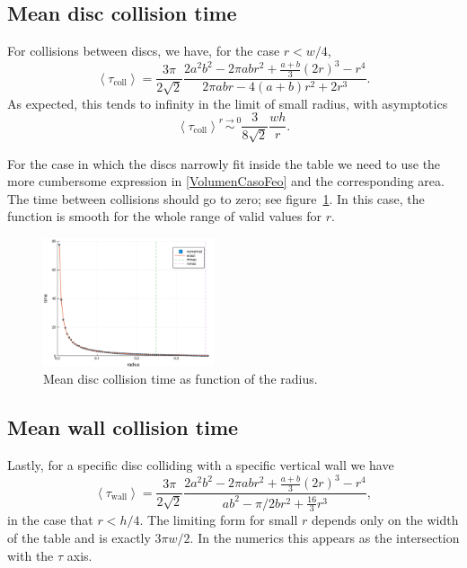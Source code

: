 \documentclass[superscriptaddress,pre,reprint,showpacs,twocolumn]{revtex4-1}
\newcommand{\mean}[1]{\left \langle #1 \right \rangle}
\begin{document}
\subsection{Mean disc collision time}

For collisions between discs, we have, for the case $r < w/4$,
\begin{equation}\label{colltau}
 \mean{\tau_\text{coll}} = 	
\frac{3 \pi}{2\sqrt{2}}
\frac {2 a^{2} b^{2}  - 2 \pi a b r^{2} + \textstyle \frac{a+b}{3}  (2r)^{3}  -  r^4}
{2\pi a b r -4(a+b)r^2+2r^3}.
\end{equation}
As expected, this tends to infinity in the limit of small radius, with asymptotics
\begin{equation}\label{colltaulim0}
\mean{\tau_\text{coll}} \overset{r \to 0}{\sim}
\frac{3}{8\sqrt{2}}\frac{wh}{r}.
\end{equation}

For the case in which the discs narrowly fit inside the table we need to
use the more cumbersome expression in \eqref{VolumenCasoFeo} and
the corresponding area. The time between collisions should go to zero; 
see figure~\ref{MeanCol01}. In this case, the function is smooth for the whole
range of valid values for $r$.

\begin{figure}[h]
  \centering
  \includegraphics[width=0.45\textwidth]{figures/DiscCollisions01.pdf}
  \caption{Mean disc collision time as function of the radius. }\label{MeanCol01}
\end{figure}



\subsection{Mean wall collision time}

Lastly, for a specific disc colliding with a specific vertical wall we have
\begin{equation}\label{impactwall}
 \mean{\tau_\text{wall}} = 	
\frac{3 \pi}{2\sqrt{2}}
\frac { 2a^{2} b^{2}  -  2\pi a b r^{2} + \frac{a+b}{3}(2r)^3 - r^4}
{ab^2-\pi/2b r^2 + \frac{16}{3} r^3 },
\end{equation}
in the case that $r<h/4$. The limiting form for small $r$ depends
only on the width of the table and is exactly
$3\pi w/2$. In the numerics this appears as the intersection with the $\tau$
axis.
\end{document}
